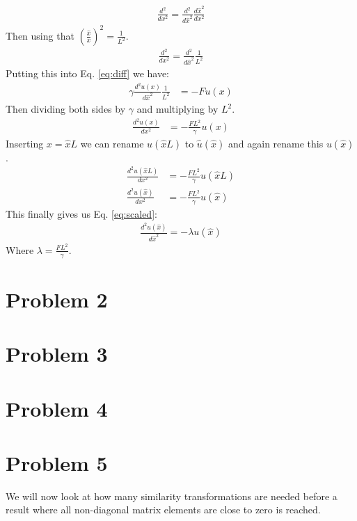 \documentclass[english,notitlepage]{revtex4-1}  %
\begin{document}
\begin{align*}
    \frac{d^2}{dx^2} = \frac{d^2}{d\hat{x}^2} \frac{d\hat{x}^2}{dx^2} 
\end{align*}
Then using that $\left(\frac{\hat{x}}{x} \right)^2 = \frac{1}{L^2}$.
\begin{align*}
    \frac{d^2}{dx^2} = \frac{d^2}{d\hat{x}^2} \frac{1}{L^2} 
\end{align*}
Putting this into Eq. \ref*{eq:diff} we have:
\begin{align*}
    \gamma \frac{d^2 u(x)}{d\hat{x}^2} \frac{1}{L^2} &= - F u(x)
\end{align*}
Then dividing both sides by $\gamma$ and multiplying by $L^2$.
\begin{align*}
    \frac{d^2u(x)}{dx^2} &= - \frac{F L^2}{\gamma} u(x)
\end{align*}
Inserting $x = \hat{x}L$ we can rename $u(\hat{x}L)$ to $\hat{u}(\hat{x})$ and again rename this $u(\hat{x})$.
\begin{align*}
    \frac{d^2u(\hat{x}L)}{dx^2} &= - \frac{F L^2}{\gamma} u(\hat{x}L) \\
    \frac{d^2u(\hat{x})}{dx^2} &= - \frac{F L^2}{\gamma} u(\hat{x})
\end{align*}
This finally gives us Eq. \ref*{eq:scaled}:
\begin{align*}
    \frac{d^2u(\hat{x})}{d \hat{x}^2} = - \lambda u(\hat{x})
\end{align*}
Where $\lambda = \frac{F L^2}{\gamma}$.

\section*{Problem 2}

\section*{Problem 3}

\section*{Problem 4}

\section*{Problem 5}
We will now look at how many similarity transformations are needed 
before a result where all non-diagonal matrix elements 
are close to zero is reached. \\
\end{document}
